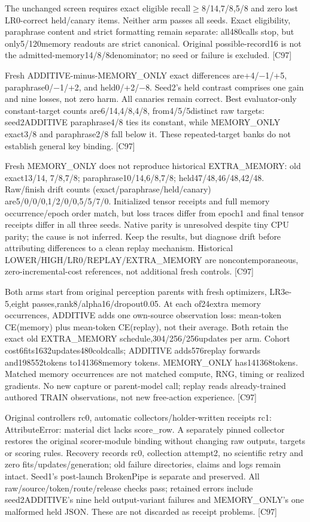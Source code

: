 \documentclass{article}
\begin{document}
The unchanged screen requires exact eligible recall$\geq$8/14,7/8,5/8 and zero lost
LR0-correct held/canary items. Neither arm passes all seeds. Exact eligibility,
paraphrase content and strict formatting remain separate: all480calls stop, but
only5/120memory readouts are strict canonical. Original possible-record16 is
not the admitted-memory14/8/8denominator; no seed or failure is excluded. [C97]

Fresh ADDITIVE-minus-MEMORY\_ONLY exact differences are+4/$-$1/+5, paraphrase0/$-$1/+2,
and held0/+2/$-$8. Seed2's held contrast comprises one gain and nine losses, not
zero harm. All canaries remain correct. Best evaluator-only constant-target
counts are6/14,4/8,4/8, from4/5/5distinct raw targets: seed2ADDITIVE paraphrase4/8
ties its constant, while MEMORY\_ONLY exact3/8 and paraphrase2/8 fall below it.
These repeated-target banks do not establish general key binding. [C97]

Fresh MEMORY\_ONLY does not reproduce historical EXTRA\_MEMORY: old exact13/14,
7/8,7/8; paraphrase10/14,6/8,7/8; held47/48,46/48,42/48. Raw/finish drift counts
(exact/paraphrase/held/canary) are5/0/0/0,1/2/0/0,5/5/7/0. Initialized tensor
receipts and full memory occurrence/epoch order match, but loss traces differ
from epoch1 and final tensor receipts differ in all three seeds. Native parity
is unresolved despite tiny CPU parity; the cause is not inferred. Keep the
results, but diagnose drift before attributing differences to a clean replay
mechanism. Historical LOWER/HIGH/LR0/REPLAY/EXTRA\_MEMORY are noncontemporaneous,
zero-incremental-cost references, not additional fresh controls. [C97]

Both arms start from original perception parents with fresh optimizers,
LR3e-5,eight passes,rank8/alpha16/dropout0.05. At each of24extra memory occurrences,
ADDITIVE adds one own-source observation loss: mean-token CE(memory) plus
mean-token CE(replay), not their average. Both retain the exact old EXTRA\_MEMORY
schedule,304/256/256updates per arm. Cohort cost6fits1632updates480coldcalls;
ADDITIVE adds576replay forwards and198552tokens to141368memory tokens. MEMORY\_ONLY
has141368tokens. Matched memory occurrences are not matched compute, RNG, timing
or realized gradients. No new capture or parent-model call; replay reads
already-trained authored TRAIN observations, not new free-action experience. [C97]

Original controllers rc0, automatic collectors/holder-written receipts rc1:
AttributeError: material dict lacks score\_row. A separately pinned collector
restores the original scorer-module binding without changing raw outputs,
targets or scoring rules. Recovery records rc0, collection attempt2, no scientific
retry and zero fits/updates/generation; old failure directories, claims and logs
remain intact. Seed1's post-launch BrokenPipe is separate and preserved.
All raw/source/token/route/release checks pass; retained errors include
seed2ADDITIVE's nine held output-variant failures and MEMORY\_ONLY's one malformed
held JSON. These are not discarded as receipt problems. [C97]
\end{document}
